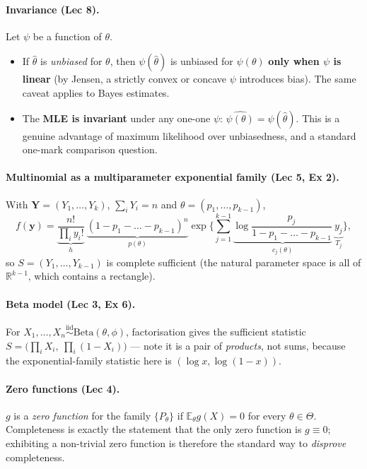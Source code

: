 \documentclass[11pt]{article}
\theoremstyle{remark}
\newcommand{\E}{\mathbb{E}}
\newcommand{\R}{\mathbb{R}}
\newcommand{\iid}{\overset{\text{iid}}{\sim}}
\begin{document}
\paragraph{Invariance (Lec 8).}
Let $\psi$ be a function of $\theta$.
\begin{itemize}
\item If $\hat\theta$ is \emph{unbiased} for $\theta$, then $\psi(\hat\theta)$ is unbiased for
$\psi(\theta)$ \textbf{only when $\psi$ is linear} (by Jensen, a strictly convex or concave
$\psi$ introduces bias). The same caveat applies to Bayes estimates.
\item The \textbf{MLE is invariant} under any one-one $\psi$: $\widehat{\psi(\theta)}=\psi(\hat\theta)$.
This is a genuine advantage of maximum likelihood over unbiasedness, and a standard one-mark
comparison question.
\end{itemize}

\paragraph{Multinomial as a multiparameter exponential family (Lec 5, Ex 2).}
With $\mathbf Y=(Y_1,\dots,Y_k)$, $\sum_iY_i=n$ and $\theta=(p_1,\dots,p_{k-1})$,
\[
f(\mathbf y)=\underbrace{\frac{n!}{\prod_i y_i!}}_{h}\ \underbrace{(1-p_1-\dots-p_{k-1})^{n}}_{p(\theta)}
\exp\Big\{\sum_{j=1}^{k-1}\underbrace{\log\frac{p_j}{1-p_1-\dots-p_{k-1}}}_{c_j(\theta)}\ \underbrace{y_j}_{T_j}\Big\},
\]
so $S=(Y_1,\dots,Y_{k-1})$ is complete sufficient (the natural parameter space is all of
$\R^{k-1}$, which contains a rectangle).

\paragraph{Beta model (Lec 3, Ex 6).} For $X_1,\dots,X_n\iid\mathrm{Beta}(\theta,\phi)$,
factorisation gives the sufficient statistic
$S=\big(\prod_iX_i,\ \prod_i(1-X_i)\big)$ --- note it is a pair of \emph{products}, not sums,
because the exponential-family statistic here is $(\log x,\log(1-x))$.

\paragraph{Zero functions (Lec 4).} $g$ is a \emph{zero function} for the family
$\{P_\theta\}$ if $\E_\theta g(X)=0$ for every $\theta\in\Theta$. Completeness is exactly the
statement that the only zero function is $g\equiv0$; exhibiting a non-trivial zero function is
therefore the standard way to \emph{disprove} completeness.
\end{document}
